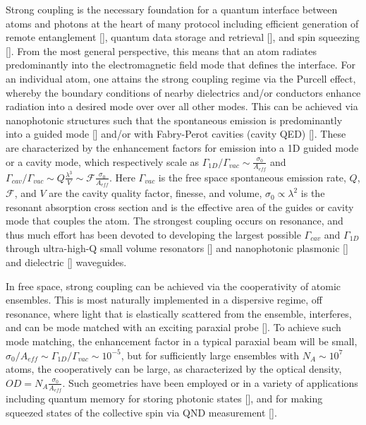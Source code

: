 \documentclass[preprint,aps,pra,onecolumn]{revtex4-1} %
\begin{document}
Strong coupling is the necessary foundation for a quantum interface between atoms and photons at the 
heart of many protocol including efficient generation of remote entanglement [], quantum data storage 
and retrieval [], and  spin squeezing []. From the most general perspective, this means that an atom 
radiates predominantly into the electromagnetic field mode that defines the interface.  For an 
individual atom, one attains the strong coupling regime via the Purcell effect, whereby the boundary 
conditions of nearby dielectrics and/or conductors enhance radiation into a desired mode over over all 
other modes.  This can be achieved via nanophotonic structures such that the spontaneous emission is 
predominantly into a guided mode [] and/or with Fabry-Perot cavities (cavity QED) [].   These are 
characterized by the enhancement factors for emission into a 1D guided mode or a cavity mode, which 
respectively scale as  $ \Gamma_{1D}/\Gamma_{vac} \sim \frac{\sigma_0}{A_{eff}}$ and  
$\Gamma_{cav}/\Gamma_{vac} \sim   Q \frac{\lambda^3}{V}\sim \mathcal{F}  \frac{\sigma_0}{A_{eff}}$.  
Here $\Gamma_{vac}$ is the free space spontaneous emission rate, $Q$, $\mathcal{F}$, and $V$ are the 
cavity quality factor, finesse, and volume, $\sigma_0 \propto \lambda^2$ is the resonant absorption cross 
section and is the effective area of the guides or cavity mode that couples the atom.  The strongest 
coupling occurs on resonance, and thus much effort has been devoted to developing the largest possible 
$\Gamma_{cav}$ and $\Gamma_{1D}$ through ultra-high-Q small volume resonators [] and 
nanophotonic plasmonic [] and dielectric [] waveguides.  

In free space, strong coupling can be achieved via the cooperativity of atomic ensembles.  This is most 
naturally implemented in a dispersive regime, off resonance, where light that is elastically scattered 
from the ensemble, interferes, and can be mode matched with an exciting paraxial probe [].  To achieve 
such mode matching, the enhancement factor in a typical paraxial beam will be small, $\sigma_0/A_{eff} 
\sim \Gamma_{1D}/\Gamma_{vac} \sim 10^{-5}$, but for sufficiently large ensembles with $N_A \sim 
10^7$ atoms, the cooperatively can be large, as characterized by the optical density, $OD = N_A 
\frac{\sigma_0}{A_{eff}}$.  Such geometries have been employed or in a variety of applications including 
quantum memory for storing photonic states [], and for  making squeezed states of the collective spin via 
QND measurement [].   
\end{document}
